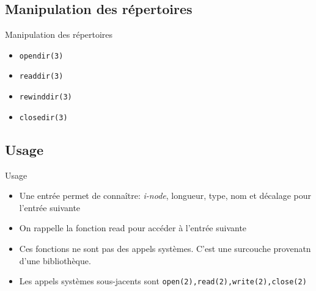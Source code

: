 \begin{frame}[containsverbatim]{\sectitle}
\def\subsectitle{Manipulation des répertoires}
\subsection{\subsectitle}
\begin{exampleblock}{\subsectitle}
    \begin{itemize}
        \item \verb+opendir(3)+
        \item \verb+readdir(3)+
        \item \verb+rewinddir(3)+
        \item \verb+closedir(3)+
    \end{itemize}
\end{exampleblock}

\def\subsectitle{Usage}
\subsection{\subsectitle}
\begin{block}{\subsectitle}
    \begin{itemize}
        \item Une entrée permet de connaître: \textit{i-node}, longueur, type,
            nom et décalage pour l'entrée suivante
        \item On rappelle la fonction read pour accéder à l'entrée suivante
        \item Ces fonctions ne sont pas des appels systèmes. C'est une surcouche
            provenatn d'une bibliothèque.
        \item Les appels systèmes sous-jacents sont
            \verb+open(2),read(2),write(2),close(2)+
    \end{itemize}
\end{block}
\end{frame}


\def\sectitle{Montages}
